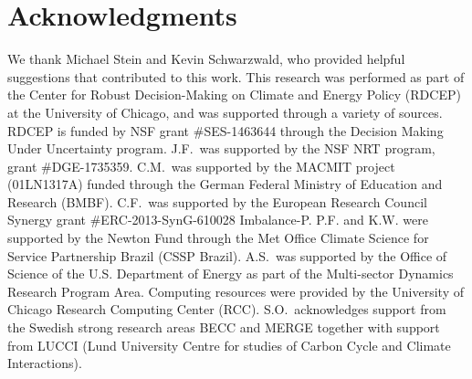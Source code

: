 \documentclass[preprint, 5p, times, twocolumn]{elsarticle}
\begin{document}
{%



\section{Acknowledgments}
\label{S:5}
We thank Michael Stein and Kevin Schwarzwald, who provided helpful suggestions that contributed to this work. This research was performed as part of the Center for Robust Decision-Making on Climate and Energy Policy (RDCEP) at the University of Chicago, and was supported through a variety of sources. RDCEP is funded by NSF grant \#SES-1463644 through the Decision Making Under Uncertainty program. J.F.\ was supported by the NSF NRT program, grant \#DGE-1735359. C.M.\ was supported by the MACMIT project (01LN1317A) funded through the German Federal Ministry of Education and Research (BMBF).  C.F.\ was supported by the European Research Council Synergy grant \#ERC-2013-SynG-610028 Imbalance-P. P.F. and K.W. were supported  by the Newton Fund through the Met Office Climate Science for Service Partnership Brazil (CSSP Brazil). A.S.\ was supported by the Office of Science of the U.S. Department of Energy as part of the Multi-sector Dynamics Research Program Area. Computing resources were provided by the University of Chicago Research Computing Center (RCC). S.O.\ acknowledges support from the Swedish strong research areas BECC and MERGE together with support from LUCCI (Lund University Centre for studies of Carbon Cycle and Climate Interactions).
}
\end{document}

